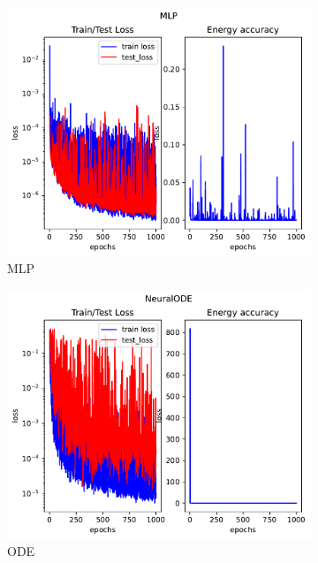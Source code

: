 \begin{figure}[H]
	\centering
	\begin{subfigure}[b]{0.3\textwidth}
		\centering
		\includegraphics[width=\textwidth]{chapters/chapter5/body2_mlp_loss.pdf}
		\caption{MLP}
	\end{subfigure}
	\hfill
	\begin{subfigure}[b]{0.3\textwidth}
		\centering
		\includegraphics[width=\textwidth]{chapters/chapter5/body2_ode_loss.pdf}
		\caption{ODE}
	\end{subfigure}
	\hfill
	\begin{subfigure}[b]{0.3\textwidth}

\end{subfigure}
\end{figure}
